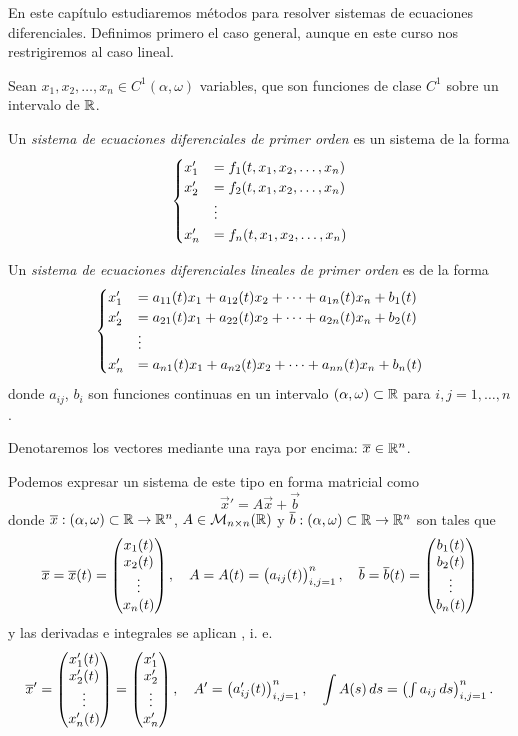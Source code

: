 \documentclass[../ecuaciones_diferenciales.tex]{subfiles}
\begin{document}
En este capítulo estudiaremos métodos para resolver sistemas de ecuaciones
diferenciales. Definimos primero el caso general, aunque en este curso nos
restrigiremos al caso lineal.

Sean \(x_1, x_2, \dots, x_n \in C^1(\alpha, \omega)\) variables, que son
funciones de clase \(C^1\) sobre un intervalo de \(\mathbb{R}\).

\begin{definition}
	Un \emph{sistema de ecuaciones diferenciales de primer orden} es un sistema de la
	forma
	\[\begin{cases}
			x'_1 &= f_1(t, x_1, x_2, \dots, x_n) \\
			x'_2 &= f_2(t, x_1, x_2, \dots, x_n) \\
			&\vdots \\
			x'_n &= f_n(t, x_1, x_2, \dots, x_n)\end{cases}\]
\end{definition}

\begin{definition}
	\label{def:siseq1ord}
	Un \emph{sistema de ecuaciones diferenciales lineales de primer orden} es de la
	forma
	\[\begin{cases}
			x'_1 &= a_{11}(t)x_1 + a_{12}(t)x_2 + \dots + a_{1n}(t)x_n + b_1(t) \\
			x'_2 &= a_{21}(t)x_1 + a_{22}(t)x_2 + \dots + a_{2n}(t)x_n + b_2(t) \\
			&\vdots \\
			x'_n &= a_{n1}(t)x_1 + a_{n2}(t)x_2 + \dots + a_{nn}(t)x_n + b_n(t)\end{cases}\]
	donde \(a_{ij}\), \(b_i\) son funciones continuas en un intervalo
	\((\alpha, \omega) \subset \mathbb{R}\) para \(i,j = 1, \dots, n\).
\end{definition}

\begin{notation}
	Denotaremos los vectores mediante una raya por encima: \(\overline{x} \in \mathbb{R}^n\).
\end{notation}

Podemos expresar un sistema de este tipo en forma matricial como
\[\vec{x}' = A\vec{x} + \vec{b}\]
donde \(\overline{x} : (\alpha, \omega) \subset \mathbb{R} \to \mathbb{R}^n\),
\(A \in \mathcal{M}_{n \times n}(\mathbb{R})\) y
\(\overline{b} : (\alpha, \omega) \subset \mathbb{R} \to \mathbb{R}^n\) son tales que
\[\overline{x} = \overline{x}(t) = \begin{pmatrix}x_1(t) \\ x_2(t) \\ \vdots \\ x_n(t)\end{pmatrix}, \quad
	A = A(t) = \begin{pmatrix}a_{ij}(t)\end{pmatrix}^n_{i,j = 1},\quad
	\overline{b} = \overline{b}(t) = \begin{pmatrix}b_1(t) \\ b_2(t) \\ \vdots \\ b_n(t)\end{pmatrix} \]
y las derivadas e integrales se aplican ,
i. e.
\[\overline{x}' = \begin{pmatrix}x'_1(t) \\ x'_2(t) \\ \vdots \\ x'_n(t)\end{pmatrix}
	= \begin{pmatrix}x'_1 \\ x'_2 \\ \vdots \\ x'_n\end{pmatrix}, \quad
	A' = \begin{pmatrix}a'_{ij}(t)\end{pmatrix}^n_{i,j = 1}, \quad
	\int A(s) \mathop{d\!} s = \begin{pmatrix}\int a_{ij} \mathop{d\!} s\end{pmatrix}^n_{i,j = 1}.\]
\end{document}
